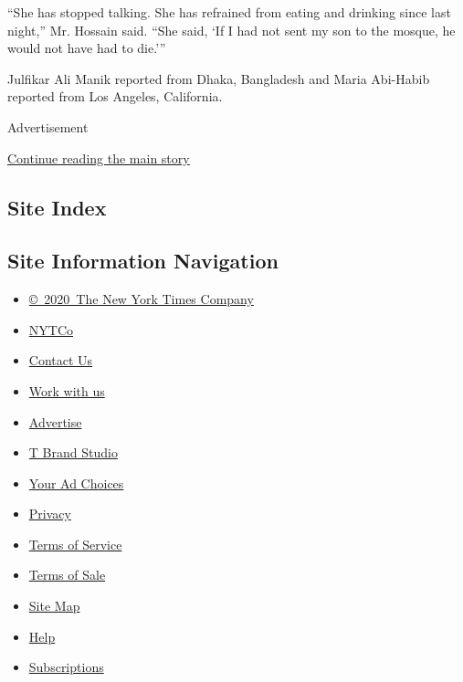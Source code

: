 ``She has stopped talking. She has refrained from eating and drinking
since last night,'' Mr. Hossain said. ``She said, `If I had not sent my
son to the mosque, he would not have had to die.'''

Julfikar Ali Manik reported from Dhaka, Bangladesh and Maria Abi-Habib
reported from Los Angeles, California.

Advertisement

\protect\hyperlink{after-bottom}{Continue reading the main story}

\hypertarget{site-index}{%
\subsection{Site Index}\label{site-index}}

\hypertarget{site-information-navigation}{%
\subsection{Site Information
Navigation}\label{site-information-navigation}}

\begin{itemize}
\tightlist
\item
  \href{https://help.nytimes3xbfgragh.onion/hc/en-us/articles/115014792127-Copyright-notice}{©~2020~The
  New York Times Company}
\end{itemize}

\begin{itemize}
\tightlist
\item
  \href{https://www.nytco.com/}{NYTCo}
\item
  \href{https://help.nytimes3xbfgragh.onion/hc/en-us/articles/115015385887-Contact-Us}{Contact
  Us}
\item
  \href{https://www.nytco.com/careers/}{Work with us}
\item
  \href{https://nytmediakit.com/}{Advertise}
\item
  \href{http://www.tbrandstudio.com/}{T Brand Studio}
\item
  \href{https://www.nytimes3xbfgragh.onion/privacy/cookie-policy\#how-do-i-manage-trackers}{Your
  Ad Choices}
\item
  \href{https://www.nytimes3xbfgragh.onion/privacy}{Privacy}
\item
  \href{https://help.nytimes3xbfgragh.onion/hc/en-us/articles/115014893428-Terms-of-service}{Terms
  of Service}
\item
  \href{https://help.nytimes3xbfgragh.onion/hc/en-us/articles/115014893968-Terms-of-sale}{Terms
  of Sale}
\item
  \href{https://spiderbites.nytimes3xbfgragh.onion}{Site Map}
\item
  \href{https://help.nytimes3xbfgragh.onion/hc/en-us}{Help}
\item
  \href{https://www.nytimes3xbfgragh.onion/subscription?campaignId=37WXW}{Subscriptions}
\end{itemize}
